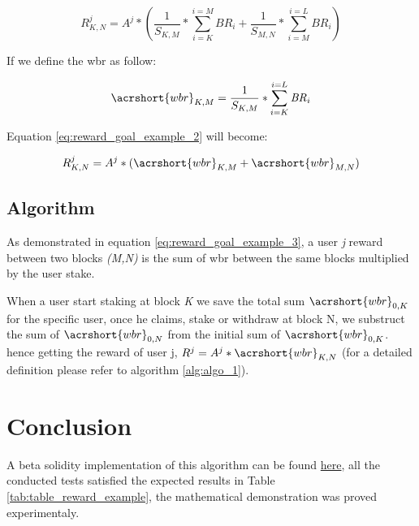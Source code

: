 \documentclass[a4paper]{article}
\begin{document}
\begin{equation} \label{eq:reward_goal_example_2}
R_{K,N}^{j}= A^j*(\frac{1}{S_{K,M}} * \sum_{i=K}^{i=M} \mathit{BR}_i + \frac{1}{S_{M,N}} * \sum_{i=M}^{i=L} \mathit{BR}_i)
\end{equation}
\begin{flushleft}
If we define the \acrfull{wbr} as follow:
\end{flushleft}
\begin{equation} \label{eq:weighted_block_reward}
\acrshort{wbr}_{K,M}= \frac{1}{S_{K,M}}*\sum_{i=K}^{i=L} \mathit{BR}_i
\end{equation}
\begin{flushleft}
Equation \ref{eq:reward_goal_example_2} will become:
\end{flushleft}
\begin{equation} \label{eq:reward_goal_example_3}
R_{K,N}^{j}= A^j*(\acrshort{wbr}_{K,M} + \acrshort{wbr}_{M,N})
\end{equation}
\subsection{Algorithm}
\noindent
As demonstrated in equation \ref{eq:reward_goal_example_3}, a user \textit{j} reward between two blocks \textit{(M,N)} is the sum of \acrshort{wbr} between the same blocks multiplied by the user stake.\par
\noindent
When a user start staking at block \textit{K} we save the total sum $\acrshort{wbr}_{0,K}$ for the specific user, once he claims, stake or withdraw at block N, we substruct the sum of $\acrshort{wbr}_{0,N}$ from the initial sum of $\acrshort{wbr}_{0,K}$. hence getting the reward of user j, $R^j=A^j*\acrshort{wbr}_{K,N}$ (for a detailed definition please refer to algorithm \ref{alg:algo_1}).\par
\section{Conclusion}
\noindent
A beta solidity implementation of this algorithm can be found \href{https://github.com/RideSolo/staking-library}{here}, all the conducted tests satisfied the expected results in Table \ref{tab:table_reward_example}, the mathematical demonstration was proved experimentaly.\par
\end{document}
